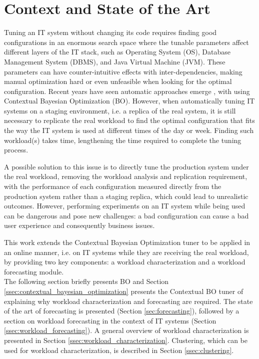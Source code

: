 \documentclass[a4paper, 12pt]{article} %
\begin{document}
	\section{Context and State of the Art } \label{sec:context_and_state_of_the_art}
	Tuning an IT system without changing its code requires finding good configurations in an enormous search space where the tunable parameters affect different layers of the IT stack, such as Operating System (OS), Database Management System (DBMS), and Java Virtual Machine (JVM). These parameters can have counter-intuitive effects with inter-dependencies, making manual optimization hard or even unfeasible when looking for the optimal configuration. Recent years have seen automatic approaches emerge \cite{AkamasCGP, OtterTune, OtterTune2, LearningToSample}, with \cite{AkamasCGP} using Contextual Bayesian Optimization (BO). However, when automatically tuning IT systems on a staging environment, i.e. a replica of the real system, it is still necessary to replicate the real workload to find the optimal configuration that fits the way the IT system is used at different times of the day or week. Finding such workload(s) takes time, lengthening the time required to complete the tuning process.
	
	A possible solution to this issue is to directly tune the production system under the real workload, removing the workload analysis and replication requirement, with the performance of each configuration measured directly from the production system rather than a staging replica, which could lead to unrealistic outcomes. However, performing experiments on an IT system while being used can be dangerous and pose new challenges: a bad configuration can cause a bad user experience and consequently business issues.
	
	This work extends the Contextual Bayesian Optimization tuner \cite{AkamasCGP} to be applied in an online manner, i.e. on IT systems while they are receiving the real workload, by providing two key components: a workload characterization and a workload forecasting module. \\
	The following section briefly presents BO and Section \ref{ssec:contextual_bayesian_optimization} presents the Contextual BO tuner of \cite{AkamasCGP} explaining why workload characterization and forecasting are required. The state of the art of forecasting is presented (Section \ref{sec:forecasting}), followed by a section on workload forecasting in the context of IT systems (Section \ref{ssec:workload_forecasting}). A general overview of workload characterization is presented in Section \ref{ssec:workload_characterization}. Clustering, which can be used for workload characterization, is described in Section \ref{ssec:clustering}.
	
\end{document}
